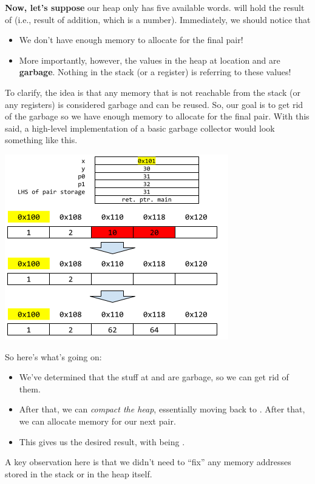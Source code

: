 \bigskip 

\textbf{Now, let's suppose} our heap only has five available words.  will hold the result of  (i.e., result of addition, which is a number). Immediately, we should notice that 
\begin{itemize}
    \item We don't have enough memory to allocate for the final pair!
    \item More importantly, however, the values in the heap at location  and  are \textbf{garbage}. Nothing in the stack (or a register) is referring to these values!  
\end{itemize}
To clarify, the idea is that any memory that is not reachable from the stack (or any registers) is considered garbage and can be reused. So, our goal is to get rid of the garbage so we have enough memory to allocate for the final pair. With this said, a high-level implementation of a basic garbage collector would look something like this. 
\begin{center}
    \includegraphics[scale=0.7]{assets/stackHeapPairGCFix1.png}
\end{center}
So here's what's going on:
\begin{itemize}
    \item We've determined that the stuff at  and  are garbage, so we can get rid of them. 
    \item After that, we can \emph{compact the heap}, essentially moving  back to . After that, we can allocate memory for our next pair. 
    \item This gives us the desired result, with  being . 
\end{itemize}
A key observation here is that we didn't need to ``fix'' any memory addresses stored in the stack or in the heap itself. 

